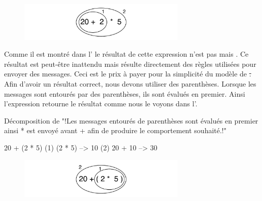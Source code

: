\documentclass[a4paper,10pt,twoside]{book}
\begin{document}
\begin{figure}
\begin{center}\includegraphics[width=8cm]{ucompoNoBracketPar}\end{center}
\end{figure}
\noindent
Comme il est montr\'e dans l' le r\'esultat de
cette expression n'est pas  mais . Ce r\'esultat est
peut-\^etre inattendu mais r\'esulte directement des r\`egles
utilis\'ees pour envoyer des messages. Ceci est le prix \`a payer pour
la simplicit\'e du mod\`ele de \st. Afin d'avoir un r\'esultat
correct, nous devons utiliser des parenth\`eses. Lorsque les messages
sont entour\'es par des parenth\`eses, ils sont \'evalu\'es en
premier. Ainsi l'expression  retourne le r\'esultat
comme nous le voyons dans l'.

\begin{example}[mathcorrect]{D\'ecomposition de }{}
"!Les messages entour\'es de parenth\`eses sont \'evalu\'es en premier ainsi * est envoy\'e avant + afin de produire le comportement souhait\'e.!"

    20 + (2 * 5) 
(1)        (2 * 5) --> 10
(2) 20 + 10      --> 30
\end{example}

\begin{figure}
\begin{center}
\includegraphics[width=8cm]{ucompoNumberBracket}
\end{center}
\end{figure}


\end{document}
